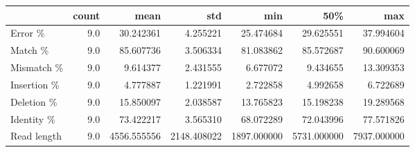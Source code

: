 \begin{tabular}{lrrrrrr}
\toprule
{} &  count &         mean &          std &          min &          50\% &          max \\
\midrule
Error \%     &    9.0 &    30.242361 &     4.255221 &    25.474684 &    29.625551 &    37.994604 \\
Match \%     &    9.0 &    85.607736 &     3.506334 &    81.083862 &    85.572687 &    90.600069 \\
Mismatch \%  &    9.0 &     9.614377 &     2.431555 &     6.677072 &     9.434655 &    13.309353 \\
Insertion \% &    9.0 &     4.777887 &     1.221991 &     2.722858 &     4.992658 &     6.722689 \\
Deletion \%  &    9.0 &    15.850097 &     2.038587 &    13.765823 &    15.198238 &    19.289568 \\
Identity \%  &    9.0 &    73.422217 &     3.565310 &    68.072289 &    72.043996 &    77.571826 \\
Read length &    9.0 &  4556.555556 &  2148.408022 &  1897.000000 &  5731.000000 &  7937.000000 \\
\bottomrule
\end{tabular}
